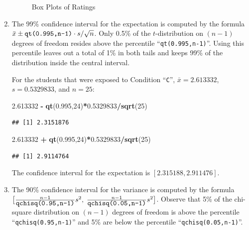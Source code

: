 \documentclass[]{krantz}
\makeatletter
\newenvironment{Shaded}{\begin{snugshade}}{\end{snugshade}}
\newcommand{\DecValTok}[1]{\textcolor[rgb]{0.00,0.00,0.81}{#1}}
\newcommand{\FloatTok}[1]{\textcolor[rgb]{0.00,0.00,0.81}{#1}}
\newcommand{\KeywordTok}[1]{\textcolor[rgb]{0.13,0.29,0.53}{\textbf{#1}}}
\newcommand{\NormalTok}[1]{#1}
\newcommand{\OperatorTok}[1]{\textcolor[rgb]{0.81,0.36,0.00}{\textbf{#1}}}
\newcommand{\StringTok}[1]{\textcolor[rgb]{0.31,0.60,0.02}{#1}}
\newenvironment{kframe}{%
\medskip{}
\setlength{\fboxsep}{.8em}
 \def\at@end@of@kframe{}%
 \ifinner\ifhmode%
  \def\at@end@of@kframe{\end{minipage}}%
  \begin{minipage}{\columnwidth}%
 \fi\fi%
 \def\FrameCommand##1{\hskip\@totalleftmargin \hskip-\fboxsep
 \colorbox{shadecolor}{##1}\hskip-\fboxsep
     \hskip-\linewidth \hskip-\@totalleftmargin \hskip\columnwidth}%
 \MakeFramed {\advance\hsize-\width
   \@totalleftmargin\z@ \linewidth\hsize
   \@setminipage}}%
 {\par\unskip\endMakeFramed%
 \at@end@of@kframe}
\renewenvironment{Shaded}{\begin{kframe}}{\end{kframe}}
\theoremstyle{definition}
\theoremstyle{definition}
\theoremstyle{definition}
\theoremstyle{remark}
\makeatother
\begin{document}
\begin{enumerate}
\begin{figure}
{   }

   \caption{Box Plots of Ratings}\label{fig:Confidence2}
   \end{figure}
\item
  The 99\% confidence interval for
  the expectation is computed by the formula
  \(\bar x \pm \mbox{\texttt{qt(0.995,n-1)}} \cdot s/\sqrt{n}\). Only 0.5\%
  of the \(t\)-distribution on \((n-1)\) degrees of freedom resides above the
  percentile ``\texttt{qt(0.995,n-1)}''. Using this percentile leaves out a total
  of 1\% in both tails and keeps 99\% of the distribution inside the central
  interval.

  For the students that were exposed to Condition ``\texttt{C}'',
  \(\bar x = 2.613332\), \(s = 0.5329833\), and \(n = 25\):

\begin{Shaded}
\begin{Highlighting}[]
\FloatTok{2.613332} \OperatorTok{-}\StringTok{ }\KeywordTok{qt}\NormalTok{(}\FloatTok{0.995}\NormalTok{,}\DecValTok{24}\NormalTok{)}\OperatorTok{*}\FloatTok{0.5329833}\OperatorTok{/}\KeywordTok{sqrt}\NormalTok{(}\DecValTok{25}\NormalTok{)}
\end{Highlighting}
\end{Shaded}

\begin{verbatim}
## [1] 2.3151876
\end{verbatim}

\begin{Shaded}
\begin{Highlighting}[]
\FloatTok{2.613332} \OperatorTok{+}\StringTok{ }\KeywordTok{qt}\NormalTok{(}\FloatTok{0.995}\NormalTok{,}\DecValTok{24}\NormalTok{)}\OperatorTok{*}\FloatTok{0.5329833}\OperatorTok{/}\KeywordTok{sqrt}\NormalTok{(}\DecValTok{25}\NormalTok{)}
\end{Highlighting}
\end{Shaded}

\begin{verbatim}
## [1] 2.9114764
\end{verbatim}

  The confidence interval for the expectation is \([2.315188, 2.911476]\).
\item
  The 90\% confidence interval for
  the variance is computed by the formula
  \(\big[\frac{n-1}{\mbox{\texttt{qchisq(0.95,n-1)}}} s^2 ,\;\frac{n-1}{\mbox{\texttt{qchisq(0.05,n-1)}}} s^2\big]\).
  Observe that 5\% of the chi-square distribution on \((n-1)\) degrees of
  freedom is above the percentile ``\texttt{qchisq(0.95,n-1)}'' and 5\% are below
  the percentile ``\texttt{qchisq(0.05,n-1)}''.


\end{enumerate}
\end{document}
